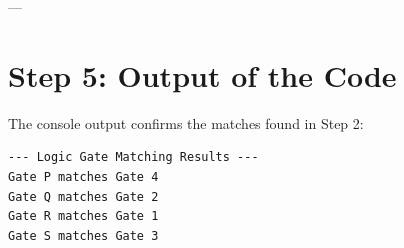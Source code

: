 \documentclass[11pt]{article}
\begin{document}
---

\section{Step 5: Output of the Code}
The console output confirms the matches found in Step 2:

\begin{lstlisting}[backgroundcolor=\color{black}, basicstyle=\ttfamily\color{white}]
--- Logic Gate Matching Results ---
Gate P matches Gate 4
Gate Q matches Gate 2
Gate R matches Gate 1
Gate S matches Gate 3
\end{lstlisting}
\end{document}
